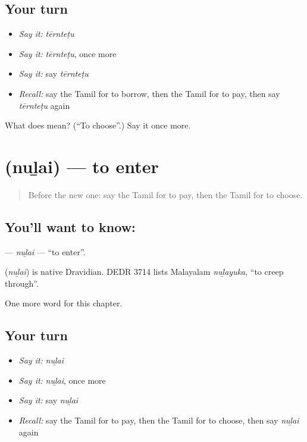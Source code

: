 \subsection*{Your turn}
\begin{itemize}
\raggedright
  \item \emph{Say it:} \emph{tērnteṭu}
  \item \emph{Say it:} \emph{tērnteṭu}, once more
  \item \emph{Say it:} say \emph{tērnteṭu}
  \item \emph{Recall:} say the Tamil for to borrow, then the Tamil for to pay, then say \emph{tērnteṭu} again
\end{itemize}

\begin{tcolorbox}[breakable,colback=teal!4,colframe=teal!35!black,title={Before you move on}]
What does  mean? (\textquotedblleft{}To choose\textquotedblright{}.) Say it once more.
\end{tcolorbox}
\section[\texorpdfstring{\ta{நுழை} (nuḻai)}{நுழை (nuḻai)}]{ (nuḻai) — to enter}

\label{lesson:TA-C254-nulai}



\begin{quote}
Before the new one: say the Tamil for to pay, then the Tamil for to choose.
\end{quote}

\subsection*{You'll want to know: }
\textbf{} — \emph{nuḻai} — \textquotedblleft{}to enter\textquotedblright{}.

\begin{cousinweb}
\textbf{} (\emph{nuḻai}) is native Dravidian. DEDR 3714 lists Malayalam \emph{nuḻayuka}, \textquotedblleft{}to creep through\textquotedblright{}.
\end{cousinweb}

\begin{grammarlens}[title={What you've built}]
One more word for this chapter.
\end{grammarlens}

\subsection*{Your turn}
\begin{itemize}
\raggedright
  \item \emph{Say it:} \emph{nuḻai}
  \item \emph{Say it:} \emph{nuḻai}, once more
  \item \emph{Say it:} say \emph{nuḻai}
  \item \emph{Recall:} say the Tamil for to pay, then the Tamil for to choose, then say \emph{nuḻai} again
\end{itemize}

